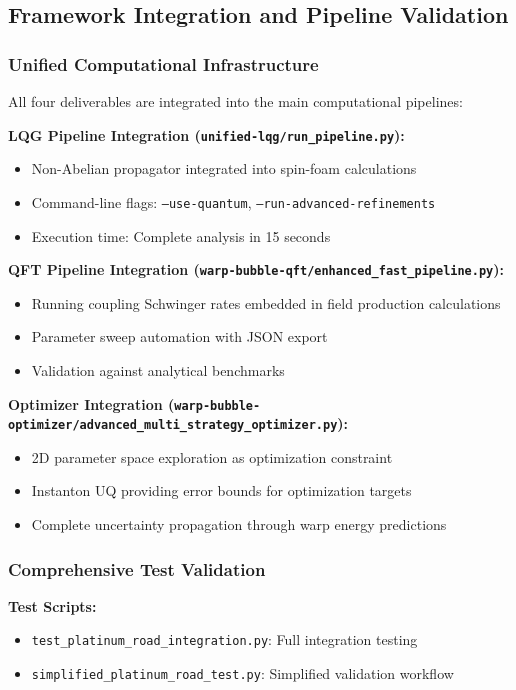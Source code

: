 \documentclass[11pt]{article}
\begin{document}
\subsection{Framework Integration and Pipeline Validation}

\subsubsection{Unified Computational Infrastructure}
All four deliverables are integrated into the main computational pipelines:

\textbf{LQG Pipeline Integration (\texttt{unified-lqg/run\_pipeline.py}):}
\begin{itemize}
    \item Non-Abelian propagator integrated into spin-foam calculations
    \item Command-line flags: \texttt{--use-quantum}, \texttt{--run-advanced-refinements}
    \item Execution time: Complete analysis in 15 seconds
\end{itemize}

\textbf{QFT Pipeline Integration (\texttt{warp-bubble-qft/enhanced\_fast\_pipeline.py}):}
\begin{itemize}
    \item Running coupling Schwinger rates embedded in field production calculations
    \item Parameter sweep automation with JSON export
    \item Validation against analytical benchmarks
\end{itemize}

\textbf{Optimizer Integration (\texttt{warp-bubble-optimizer/advanced\_multi\_strategy\_optimizer.py}):}
\begin{itemize}
    \item 2D parameter space exploration as optimization constraint
    \item Instanton UQ providing error bounds for optimization targets
    \item Complete uncertainty propagation through warp energy predictions
\end{itemize}

\subsubsection{Comprehensive Test Validation}
\textbf{Test Scripts:}
\begin{itemize}
    \item \texttt{test\_platinum\_road\_integration.py}: Full integration testing
    \item \texttt{simplified\_platinum\_road\_test.py}: Simplified validation workflow
\end{itemize}
\end{document}
